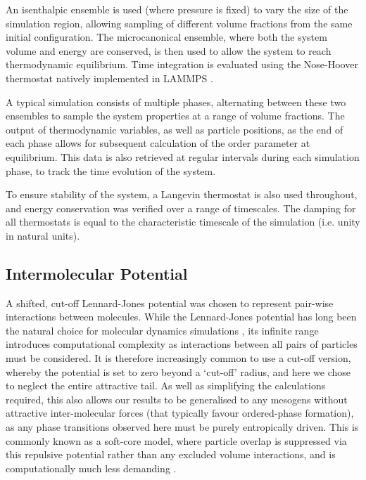 \documentclass[11pt, a4paper]{article} %
\begin{document}
An isenthalpic ensemble is used (where pressure is fixed) to vary the size of the simulation region, allowing sampling of different volume fractions from the same initial configuration. The  microcanonical ensemble, where both the system volume and energy are conserved, is then used to allow the system to reach thermodynamic equilibrium. Time integration is evaluated using the Nose-Hoover thermostat \cite{Nos1984, Hoover1985} natively implemented in LAMMPS \cite{Shinoda2004}.

A typical simulation consists of multiple phases, alternating between these two ensembles to sample the system properties at a range of volume fractions. The output of thermodynamic variables, as well as particle positions, as the end of each phase allows for subsequent calculation of the order parameter at equilibrium. This data is also retrieved at regular intervals during each simulation phase, to track the time evolution of the system.

To ensure stability of the system, a Langevin thermostat \cite{Schneider1978} is also used throughout, and energy conservation was verified over a range of timescales. The damping for all thermostats is equal to the characteristic timescale of the simulation (i.e. unity in natural units).



\subsection{Intermolecular Potential} \label{pair_potential}
A shifted, cut-off Lennard-Jones potential was chosen to represent pair-wise interactions between molecules. While the Lennard-Jones potential \cite{Jones1924a, Jones1924b} has long been the natural choice for molecular dynamics simulations \cite{Stephan2019}, its infinite range introduces computational complexity as interactions between all pairs of particles must be considered. It is therefore increasingly common to use a cut-off version, whereby the potential is set to zero beyond a `cut-off' radius, and here we chose to neglect the entire attractive tail. As well as simplifying the calculations required, this also allows our results to be generalised to any mesogens without attractive inter-molecular forces (that typically favour ordered-phase formation), as any phase transitions observed here must be purely entropically driven. This is commonly known as a soft-core model, where particle overlap is suppressed via this repulsive potential rather than any excluded volume interactions, and is computationally much less demanding \cite{Paolini1993, Hughes2008}.
\end{document}
